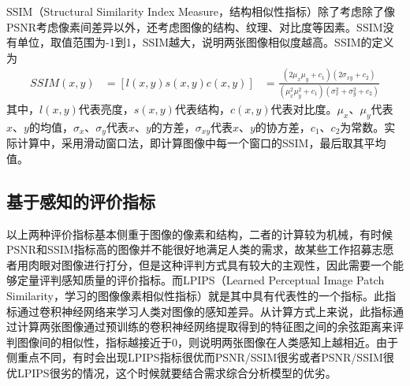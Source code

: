 SSIM\parencite{wang2002universal}（Structural Similarity Index Measure，结构相似性指标）除了考虑除了像PSNR考虑像素间差异以外，还考虑图像的结构、纹理、对比度等因素。SSIM没有单位，取值范围为-1到1，SSIM越大，说明两张图像相似度越高。SSIM的定义为
\begin{equation}
    \begin{aligned}
        SSIM(x,y)&=[l(x,y)s(x,y)c(x,y)]
                 &=\frac{(2\mu_x\mu_y+c_1)(2\sigma_{xy}+c_2)}{(\mu_x^2\mu_y^2+c_1)(\sigma_x^2+\sigma_y^2+c_2)}
    \end{aligned}
\end{equation}
其中，$l(x,y)$代表亮度，$s(x,y)$代表结构，$c(x,y)$代表对比度。$\mu_x$、$\mu_y$代表$x、y$的均值，$\sigma_x$、$\sigma_y$代表$x、y$的方差，$\sigma_{xy}$代表$x、y$的协方差，$c_1$、$c_2$为常数。实际计算中，采用滑动窗口法，即计算图像中每一个窗口的SSIM，最后取其平均值。

\subsection{基于感知的评价指标}
以上两种评价指标基本侧重于图像的像素和结构，二者的计算较为机械，有时候PSNR和SSIM指标高的图像并不能很好地满足人类的需求，故某些工作招募志愿者用肉眼对图像进行打分，但是这种评判方式具有较大的主观性，因此需要一个能够定量评判感知质量的评价指标。而LPIPS\parencite{zhang2018perceptual}（Learned Perceptual Image Patch Similarity，学习的图像像素相似性指标）就是其中具有代表性的一个指标。此指标通过卷积神经网络来学习人类对图像的感知差异。从计算方式上来说，此指标通过计算两张图像通过预训练的卷积神经网络提取得到的特征图之间的余弦距离来评判图像间的相似性，指标越接近于0，则说明两张图像在人类感知上越相近。由于侧重点不同，有时会出现LPIPS指标很优而PSNR/SSIM很劣或者PSNR/SSIM很优LPIPS很劣的情况，这个时候就要结合需求综合分析模型的优劣。